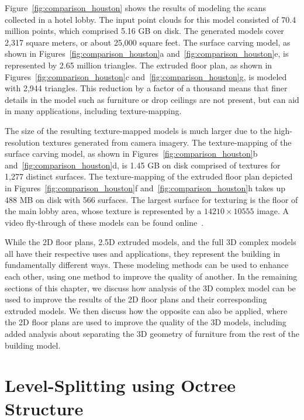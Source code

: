\documentclass[12pt,onecolumn,oneside]{book}
\begin{document}
Figure~\ref{fig:comparison_houston} shows the results of modeling the scans collected in a hotel lobby.  The input point clouds for this model consisted of 70.4 million points, which comprised 5.16 GB on disk.  The generated models cover 2,317 square meters, or about 25,000 square feet.  The surface carving model, as shown in Figures~\ref{fig:comparison_houston}a and~\ref{fig:comparison_houston}e, is represented by 2.65 million triangles.  The extruded floor plan, as shown in Figures~\ref{fig:comparison_houston}c and~\ref{fig:comparison_houston}g, is modeled with 2,944 triangles.  This reduction by a factor of a thousand means that finer details in the model such as furniture or drop ceilings are not present, but can aid in many applications, including texture-mapping.

The size of the resulting texture-mapped models is much larger due to the high-resolution textures generated from camera imagery.  The texture-mapping of the surface carving model, as shown in Figures~\ref{fig:comparison_houston}b and~\ref{fig:comparison_houston}d, is 1.45 GB on disk comprised of textures for 1,277 distinct surfaces.  The texture-mapping of the extruded floor plan depicted in Figures~\ref{fig:comparison_houston}f and~\ref{fig:comparison_houston}h takes up 488 MB on disk with 566 surfaces.  The largest surface for texturing is the floor of the main lobby area, whose texture is represented by a $14210 \times 10555$ image.  A video fly-through of these models can be found online~\cite{video}.

While the 2D floor plans, 2.5D extruded models, and the full 3D complex models all have their respective uses and applications, they represent the building in fundamentally different ways.  These modeling methods can be used to enhance each other, using one method to improve the quality of another.  In the remaining sections of this chapter, we discuss how analysis of the 3D complex model can be used to improve the results of the 2D floor plans and their corresponding extruded models.  We then discuss how the opposite can also be applied, where the 2D floor plans are used to improve the quality of the 3D models, including added analysis about separating the 3D geometry of furniture from the rest of the building model.

\section{Level-Splitting using Octree Structure}
\label{sec:octree_level_split}
\end{document}
